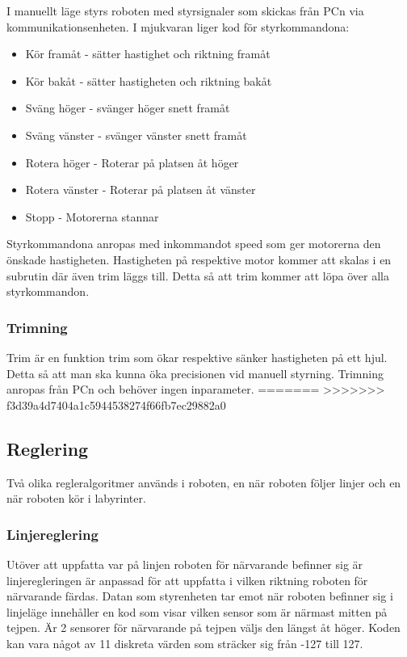 I manuellt läge styrs roboten med styrsignaler som skickas från PCn via 
kommunikationsenheten. I mjukvaran liger kod för styrkommandona:
\begin{itemize}
\item Kör framåt - sätter hastighet och riktning framåt
\item Kör bakåt - sätter hastigheten och riktning bakåt
\item Sväng höger - svänger höger snett framåt
\item Sväng vänster - svänger vänster snett framåt
\item Rotera höger - Roterar på platsen åt höger
\item Rotera vänster - Roterar på platsen åt vänster
\item Stopp - Motorerna stannar
\end{itemize}
Styrkommandona anropas med inkommandot speed som ger motorerna den
önskade hastigheten. Hastigheten på respektive motor kommer att skalas i en subrutin
där även trim läggs till. Detta så att trim kommer att löpa över alla styrkommandon.

\subsubsection{Trimning}
Trim är en funktion trim som ökar respektive sänker hastigheten på ett hjul. 
Detta så att man ska kunna öka precisionen vid manuell styrning. Trimning 
anropas från PCn och behöver ingen inparameter.
=======
>>>>>>> f3d39a4d7404a1c5944538274f66fb7ec29882a0

\subsection{Reglering}
Två olika regleralgoritmer används i roboten, en när roboten följer linjer och
en när roboten kör i labyrinter.
\subsubsection{Linjereglering}
\label{sec:linjereglering}
Utöver att uppfatta var på linjen roboten för närvarande befinner sig är 
linjeregleringen är anpassad för att uppfatta i vilken riktning roboten för 
närvarande färdas. Datan som styrenheten tar emot när roboten befinner sig i 
linjeläge innehåller en kod som visar vilken sensor som är närmast mitten på 
tejpen. Är 2 sensorer för närvarande på tejpen väljs den längst åt höger. 
Koden kan vara något av 11 diskreta värden som sträcker sig från -127 till 127.

